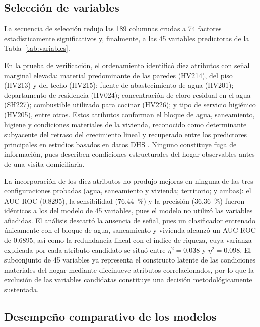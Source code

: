 \documentclass[final,5p,times,twocolumn,authoryear,lefttitle]{elsarticle}
\begin{document}
\subsection{Selección de variables}
\label{sec:seleccion}

La secuencia de selección redujo las 189 columnas crudas a 74 factores estadísticamente significativos y, finalmente, a las 45 variables predictoras de la Tabla~\ref{tab:variables}.

En la prueba de verificación, el ordenamiento identificó diez atributos con señal marginal elevada: material predominante de las paredes (HV214), del piso (HV213) y del techo (HV215); fuente de abastecimiento de agua (HV201); departamento de residencia (HV024); concentración de cloro residual en el agua (SH227); combustible utilizado para cocinar (HV226); y tipo de servicio higiénico (HV205), entre otros. Estos atributos conforman el bloque de agua, saneamiento, higiene y condiciones materiales de la vivienda, reconocido como determinante subyacente del retraso del crecimiento lineal \citep{black2013lancet,victora2021lancet} y recuperado entre los predictores principales en estudios basados en datos DHS \citep{bitew2021ethiopia}. Ninguno constituye fuga de información, pues describen condiciones estructurales del hogar observables antes de una visita domiciliaria.

La incorporación de los diez atributos no produjo mejoras en ninguna de las tres configuraciones probadas (agua, saneamiento y vivienda; territorio; y ambas): el AUC-ROC (0.8295), la sensibilidad (76.44~\%) y la precisión (36.36~\%) fueron idénticos a los del modelo de 45 variables, pues el modelo no utilizó las variables añadidas. El análisis descartó la ausencia de señal, pues un clasificador entrenado únicamente con el bloque de agua, saneamiento y vivienda alcanzó un AUC-ROC de 0.6895, así como la redundancia lineal con el índice de riqueza, cuya varianza explicada por cada atributo candidato se situó entre $\eta^2=0.038$ y $\eta^2=0.098$. El subconjunto de 45 variables ya representa el constructo latente de las condiciones materiales del hogar mediante diecinueve atributos correlacionados, por lo que la exclusión de las variables candidatas constituye una decisión metodológicamente sustentada.

\subsection{Desempeño comparativo de los modelos}
\end{document}
